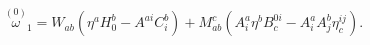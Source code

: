 \begin{equation}
\stackrel{(0)}{\omega }_{1}=W_{ab}\left( \eta
^{a}H_{0}^{b}-A^{ai}C_{i}^{b}\right) +M_{ab}^{c}\left( A_{i}^{a}\eta
^{b}B_{c}^{0i}-A_{i}^{a}A_{j}^{b}\eta _{c}^{ij}\right) .  \label{c19}
\end{equation}

